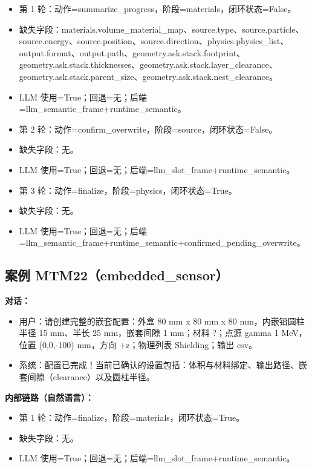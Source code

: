 \documentclass[11pt]{ctexart}
\begin{document}
\begin{itemize}
\item 第 1 轮：动作=summarize\_progress，阶段=materials，闭环状态=False。
\item 缺失字段：materials.volume\_material\_map、source.type、source.particle、source.energy、source.position、source.direction、physics.physics\_list、output.format、output.path、geometry.ask.stack.footprint、geometry.ask.stack.thicknesses、geometry.ask.stack.layer\_clearance、geometry.ask.stack.parent\_size、geometry.ask.stack.nest\_clearance。
\item LLM 使用=True；回退=无；后端=llm\_semantic\_frame+runtime\_semantic。
\item 第 2 轮：动作=confirm\_overwrite，阶段=source，闭环状态=False。
\item 缺失字段：无。
\item LLM 使用=True；回退=无；后端=llm\_slot\_frame+runtime\_semantic。
\item 第 3 轮：动作=finalize，阶段=physics，闭环状态=True。
\item 缺失字段：无。
\item LLM 使用=True；回退=无；后端=llm\_semantic\_frame+runtime\_semantic+confirmed\_pending\_overwrite。
\end{itemize}
\subsection{案例 MTM22（embedded\_sensor）}
\textbf{对话：}
\begin{itemize}
\item 用户：请创建完整的嵌套配置：外盒 80 mm x 80 mm x 80 mm，内嵌铅圆柱半径 15 mm、半长 25 mm，嵌套间隙 1 mm；材料 ?；点源 gamma 1 MeV，位置 (0,0,-100) mm，方向 +z；物理列表 Shielding；输出 csv。
\item 系统：配置已完成！当前已确认的设置包括：体积与材料绑定、输出路径、嵌套间隙（clearance）以及圆柱半径。
\end{itemize}
\textbf{内部链路（自然语言）：}
\begin{itemize}
\item 第 1 轮：动作=finalize，阶段=materials，闭环状态=True。
\item 缺失字段：无。
\item LLM 使用=True；回退=无；后端=llm\_slot\_frame+runtime\_semantic。
\end{itemize}
\end{document}
